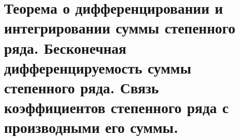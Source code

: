 {
	\section{Теорема о дифференцировании и интегрировании суммы степенного ряда. Бесконечная дифференцируемость
	суммы степенного ряда. Связь коэффициентов степенного ряда с производными его суммы.}

	\newpage
}